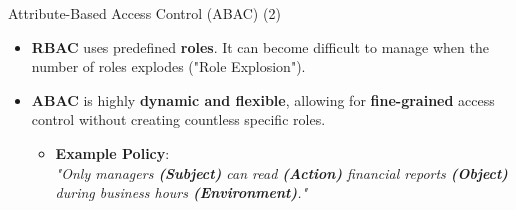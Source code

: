 \begin{frame}{Attribute-Based Access Control (ABAC) (2)}
    \Large
    \begin{itemize}
        \item \textbf{RBAC} uses predefined \textbf{roles}. It can become difficult to manage when the number of roles explodes ("Role Explosion").
        
        \vspace{0.4cm}
        \item \textbf{ABAC} is highly \textbf{dynamic and flexible}, allowing for \textbf{fine-grained} access control without creating countless specific roles.
        
        \vspace{0.2cm}
        \begin{itemize}
            \large
            \item \textbf{Example Policy}: \\
            \textit{"Only managers \textbf{(Subject)} can read \textbf{(Action)} financial reports \textbf{(Object)} during business hours \textbf{(Environment)}."}
        \end{itemize}
    \end{itemize}
\end{frame}
